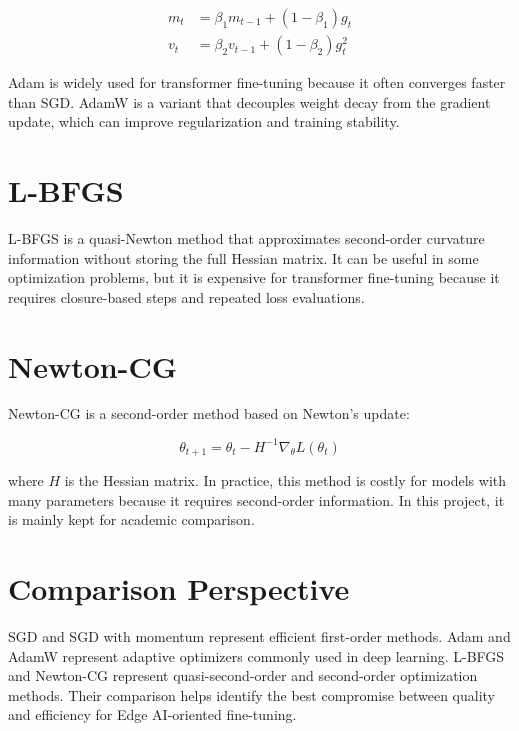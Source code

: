 \begin{align}
    m_t &= \beta_1 m_{t-1} + (1 - \beta_1) g_t \\
    v_t &= \beta_2 v_{t-1} + (1 - \beta_2) g_t^2
\end{align}

Adam is widely used for transformer fine-tuning because it often converges faster
than SGD. AdamW is a variant that decouples weight decay from the gradient update,
which can improve regularization and training stability.

\section{L-BFGS}

L-BFGS is a quasi-Newton method that approximates second-order curvature
information without storing the full Hessian matrix. It can be useful in some
optimization problems, but it is expensive for transformer fine-tuning because it
requires closure-based steps and repeated loss evaluations.

\section{Newton-CG}

Newton-CG is a second-order method based on Newton's update:

\begin{equation}
    \theta_{t+1} = \theta_t - H^{-1} \nabla_{\theta} L(\theta_t)
\end{equation}

where \(H\) is the Hessian matrix. In practice, this method is costly for models
with many parameters because it requires second-order information. In this
project, it is mainly kept for academic comparison.

\section{Comparison Perspective}

SGD and SGD with momentum represent efficient first-order methods. Adam and AdamW
represent adaptive optimizers commonly used in deep learning. L-BFGS and
Newton-CG represent quasi-second-order and second-order optimization methods.
Their comparison helps identify the best compromise between quality and
efficiency for Edge AI-oriented fine-tuning.
